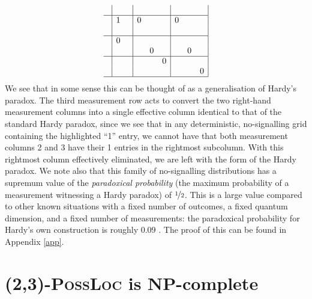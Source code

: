 \documentclass[reprint]{revtex4-1}
\theoremstyle{definition}
\begin{document}
\begin{equation*}
\begin{array}{ c | c c | c c c| c c c|}
&&&&&&&& \\ \hline
&1&&0&&&0&&\\
   &&&&&&&&\\ \hline
   &0&&&&&&&\\ 
  &&&&0&&&0&\\ \hline
  &&&&&0&&&\\ 
  &&&&&&&&0\\ \hline
\end{array}
\end{equation*}
We see that in some sense this can be thought of as a generalisation of Hardy's paradox. The third measurement row acts to convert the two right-hand measurement columns into a single effective column identical to that of the standard Hardy paradox, since we see that in any deterministic, no-signalling grid containing the highlighted ``1'' entry, we cannot have that both measurement columns 2 and 3 have their 1 entries in the rightmost subcolumn. With this rightmost column effectively eliminated, we are left with the form of the Hardy paradox. We note also that this family of no-signalling distributions has a supremum value of the \emph{paradoxical probability} (the maximum probability of a measurement witnessing a Hardy paradox) of $\nicefrac{1}{2}$. This is a large value compared to other known situations with a fixed number of outcomes, a fixed quantum dimension, and a fixed number of measurements: the paradoxical probability for Hardy's own construction is roughly 0.09 \cite{Hard1993}. The proof of this can be found in Appendix \ref{app}.



\section{\textsc{(2,3)-PossLoc} is \textbf{NP}-complete}
\end{document}
